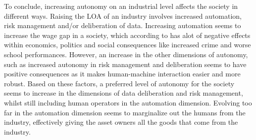 \documentclass[11pt]{article}
\begin{document}
  To conclude, increasing autonomy on an industrial level affects the society in different ways. Raising the LOA of an industry involves increased automation, risk management and/or deliberation of data. Increasing automation seems to increase the wage gap in a society, which according to \cite{consequenceOfInequality} has alot of negative effects within economics, politics and social consequences like increased crime and worse school performances. However, an increase in the other dimensions of autonomy, such as increased autonomy in risk management and deliberation seems to have positive consequences as it makes human-machine interaction easier and more robust. Based on these factors, a preferred level of autonomy for the society seems to increase in the dimensions of data deliberation and risk management, whilst still including human operators in the automation dimension. Evolving too far in the automation dimension seems to marginalize out the humans from the industry, effectively giving the asset owners all the goods that come from the industry.

  \printbibliography
\end{document}
